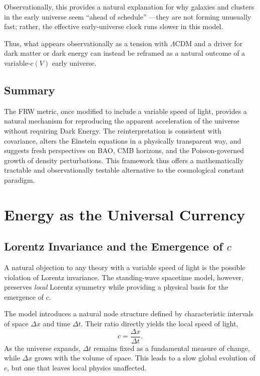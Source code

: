 \documentclass[12pt]{article}
\begin{document}
Observationally, this provides a natural explanation for why galaxies and clusters in the early universe seem ``ahead of schedule'' \cite{adams2023, naidu2022}---they are not forming unusually fast; rather, the effective early-universe clock runs slower in this model.

Thus, what appears observationally as a tension with $\Lambda$CDM and a driver for dark matter or dark energy can instead be reframed as a natural outcome of a variable-$c(V)$ early universe.

\subsection{Summary}

The FRW metric, once modified to include a variable speed of light, provides a natural mechanism for reproducing the apparent acceleration of the universe without requiring Dark Energy. The reinterpretation is consistent with covariance, alters the Einstein equations in a physically transparent way, and suggests fresh perspectives on BAO, CMB horizons, and the Poisson-governed growth of density perturbations. This framework thus offers a mathematically tractable and observationally testable alternative to the cosmological constant paradigm.


\section{Energy as the Universal Currency}

\subsection{Lorentz Invariance and the Emergence of \texorpdfstring{$c$}{c}}

A natural objection to any theory with a variable speed of light is the possible violation of Lorentz invariance. The standing-wave spacetime model, however, preserves \emph{local} Lorentz symmetry while providing a physical basis for the emergence of $c$.

The model introduces a natural node structure defined by characteristic intervals of space $\Delta x$ and time $\Delta t$. Their ratio directly yields the local speed of light,
\begin{equation}
c = \frac{\Delta x}{\Delta t}.
\end{equation}
As the universe expands, $\Delta t$ remains fixed as a fundamental measure of change, while $\Delta x$ grows with the volume of space. This leads to a slow global evolution of $c$, but one that leaves local physics unaffected.
\end{document}
